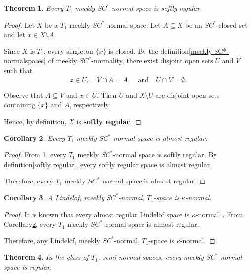 \documentclass[12pt,a4paper,twoside]{report}  %
\theoremstyle{plain}
\newtheorem{theorem}{Theorem}[section]
\newtheorem{corollary}[theorem]{Corollary}
\theoremstyle{definition}
\begin{document}
\begin{theorem}\label{the:1.5.10}
Every $T_1$ meekly $SC^*$-normal space is softly regular.
\end{theorem}

\begin{proof}
Let $X$ be a $T_1$ meekly $SC^*$-normal space.  
Let $A \subseteq X$ be an $SC^*$-closed set and let $x \in X \setminus A$.  

Since $X$ is $T_1$, every singleton $\{x\}$ is closed. By the definition\ref{meekly SC*-normalspaces} of meekly $SC^*$-normality, there exist disjoint open sets $U$ and $V$ such that
\[
x \in U, \quad \overline{V \cap A} = A, \quad \text{and} \quad \overline{U} \cap \overline{V} = \emptyset.
\]

Observe that $A \subseteq \overline{V}$ and $x \in U$. Then $U$ and $X \setminus \overline{U}$ are disjoint open sets containing $\{x\}$ and $A$, respectively.  

Hence, by definition, $X$ is \textbf{softly regular\cite{kumar2018softly}}.
\end{proof}


\begin{corollary}\label{corrollary: 1.5.11}
Every $T_1$ meekly $SC^*$-normal space is almost regular.
\end{corollary}

\begin{proof}
From \ref{the:1.5.10}, every $T_1$ meekly $SC^*$-normal space is softly regular.  
By definition\ref{softly regular}, every softly regular space is almost regular.  

Therefore, every $T_1$ meekly $SC^*$-normal space is almost regular\cite{singal1969almost}.
\end{proof}

\begin{corollary}
A Lindel\"{o}f, meekly $SC^*$-normal, $T_1$-space is $\kappa$-normal.
\end{corollary}

\begin{proof}
It is known that every almost regular Lindel\"{o}f space is $\kappa$-normal~\cite{schepin1972real}.  
From Corollary\ref{corrollary: 1.5.11}, every $T_1$ meekly $SC^*$-normal space is almost regular.  

Therefore, any Lindel\"{o}f, meekly $SC^*$-normal, $T_1$-space is $\kappa$-normal.
\end{proof}

\begin{theorem}
In the class of $T_1$, semi-normal spaces, every meekly $SC^*$-normal space is regular.
\end{theorem}
\end{document}
